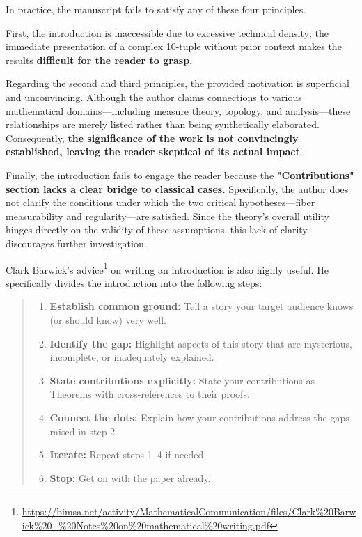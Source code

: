 \documentclass[11pt, a4paper]{article}
\begin{document}
In practice, the manuscript fails to satisfy any of these four principles. 

First, the introduction is inaccessible due to excessive technical density; the immediate presentation of a complex 10-tuple without prior context makes the results \textbf{difficult for the reader to grasp.}

Regarding the second and third principles, the provided motivation is superficial and unconvincing. Although the author claims connections to various mathematical domains—including measure theory, topology, and analysis—these relationships are merely listed rather than being synthetically elaborated. Consequently, \textbf{the significance of the work is not convincingly established, leaving the reader skeptical of its actual impact}.

Finally, the introduction fails to engage the reader because the \textbf{"Contributions" section lacks a clear bridge to classical cases.} Specifically, the author does not clarify the conditions under which the two critical hypotheses—fiber measurability and regularity—are satisfied. Since the theory's overall utility hinges directly on the validity of these assumptions, this lack of clarity discourages further investigation.

Clark Barwick's {advice}\footnote{\url{https://bimsa.net/activity/MathematicalCommunication/files/Clark\%20Barwick\%20--\%20Notes\%20on\%20mathematical\%20writing.pdf}} on writing an introduction is also highly useful. He specifically divides the introduction into the following steps:

\begin{quote}
    \small
    \begin{enumerate}
        \item \textbf{Establish common ground:} Tell a story your target audience knows (or should know) very well.
        \item \textbf{Identify the gap:} Highlight aspects of this story that are mysterious, incomplete, or inadequately explained.
        \item \textbf{State contributions explicitly:} State your contributions as Theorems with cross-references to their proofs.
        \item \textbf{Connect the dots:} Explain how your contributions address the gaps raised in step 2.
        \item \textbf{Iterate:} Repeat steps 1--4 if needed.
        \item \textbf{Stop:} Get on with the paper already.
    \end{enumerate}
\end{quote}
\end{document}
